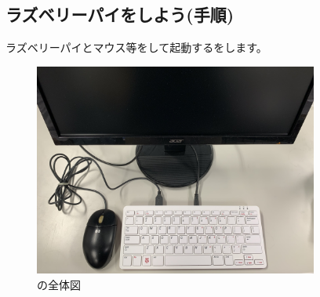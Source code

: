 \clearpage


% 
% 
\subsection{ラズベリーパイをしよう(手順)}

ラズベリーパイとマウス等をして起動するをします。

\begin{figure}[H]
  \centering
  \includegraphics[keepaspectratio,height=7cm]{text01-img/connections01-2023.jpg}
  \caption{の全体図}
  \label{fig:1}
\end{figure}

